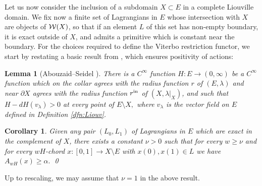 \documentclass{article}
\theoremstyle{plain}%
\newtheorem{lem}[thm]{Lemma}
\newtheorem{cor}[thm]{Corollary}
\theoremstyle{definition}
\numberwithin{equation}{section}
\numberwithin{figure}{section}
\def\l{\label}
\def\ge{\geqslant}
\def\cW{{\mathbin{\cal W}}}
\def\al{\alpha}
\def\la{\lambda}
\def\-{\setminus}
\def\iy{\infty}
\begin{document}
Let us now consider the inclusion of a subdomain $X \subset E$ in a complete Liouville domain. We fix now a finite set of Lagrangians in $E$ whose intersection with $X$ are objects of $\cW(X)$, so that if an element $L$ of this set has non-empty boundary, it is exact outside of $X$, and admits a primitive which is constant near the boundary. For the choices required to define the Viterbo restriction functor, we start by restating a basic result from \cite{AS}, which ensures positivity of actions:
\begin{lem}[Abouzaid--Seidel {\cite[Lemma 7.3]{AS}}]\l{lem: AS7.3}
There is a  $C^\iy$ function  $H:E\to(0,\iy)$ be a $C^\iy$ function which on the collar agrees with the radius function $r$ of $(E,\la)$ and near $\partial X$ agrees with the radius function $r^{\rm in}$ of $(X,\la|_X)$, and such that $H-dH(v_\la)>0$ at every point of $E\-X,$ where $v_\la$ is the vector field on $E$ defined in Definition \ref{dfn:Liouv}. 
\end{lem}
\begin{cor}
Given any pair $(L_0,L_1)$ of Lagrangians in $E$ which are exact in the complement of $X$, there exists a constant $\nu>0$ such that for every $w\ge\nu$ and for every $wH$-chord $x:[0,1]\to X\-E$ with $x(0),x(1)\in L$ we have $A_{wH}(x)\ge\al.$ \qed
\end{cor}
Up to rescaling, we may assume that $\nu=1$ in the above result.
%

\end{document}
